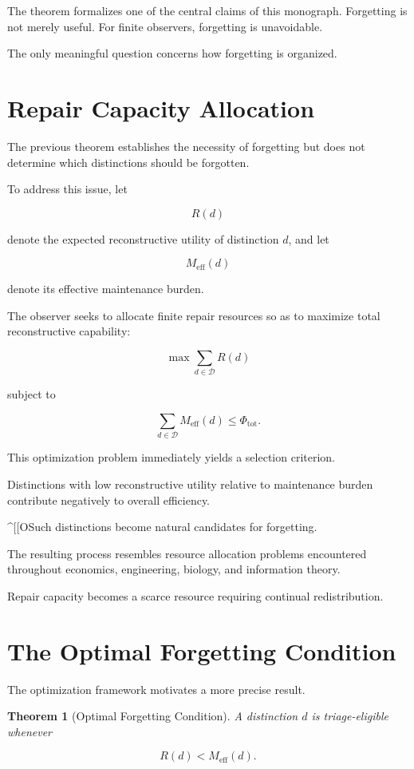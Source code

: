 \documentclass[12pt,oneside]{book}
\theoremstyle{plain} \newtheorem{theorem}{Theorem}[chapter] \newtheorem{lemma}[theorem]{Lemma} \newtheorem{proposition}[theorem]{Proposition} \newtheorem{corollary}[theorem]{Corollary}
\theoremstyle{definition} \newtheorem{definition}[theorem]{Definition} \newtheorem{axiom}[theorem]{Axiom} \newtheorem{construction}[theorem]{Construction}
\theoremstyle{remark} \newtheorem{remark}[theorem]{Remark} \newtheorem{example}[theorem]{Example}
\newcommand{\D}{\mathcal{D}} \newcommand{\R}{\mathcal{R}} \newcommand{\F}{\mathcal{F}} \newcommand{\U}{\mathcal{U}} \newcommand{\M}{\mathcal{M}} \newcommand{\G}{\Gamma}
\begin{document}
The theorem formalizes one of the central claims of this monograph. Forgetting is not merely useful. For finite observers, forgetting is unavoidable.

The only meaningful question concerns how forgetting is organized.

\section{Repair Capacity Allocation}

The previous theorem establishes the necessity of forgetting but does not determine which distinctions should be forgotten.

To address this issue, let

\[
R(d)
\]

denote the expected reconstructive utility of distinction $d$, and let

\[
M_{\mathrm{eff}}(d)
\]

denote its effective maintenance burden.

The observer seeks to allocate finite repair resources so as to maximize total reconstructive capability:

\[
\max
\sum_{d\in\D}
R(d)
\]

subject to

\[
\sum_{d\in\D}
M_{\mathrm{eff}}(d)
\leq
\Phi_{\mathrm{tot}}.
\]

This optimization problem immediately yields a selection criterion.

Distinctions with low reconstructive utility relative to maintenance burden contribute negatively to overall efficiency.

^[[OSuch distinctions become natural candidates for forgetting.

The resulting process resembles resource allocation problems encountered throughout economics, engineering, biology, and information theory.

Repair capacity becomes a scarce resource requiring continual redistribution.

\section{The Optimal Forgetting Condition}

The optimization framework motivates a more precise result.

\begin{theorem}[Optimal Forgetting Condition]

A distinction $d$ is triage-eligible whenever

\[
R(d)
<
M_{\mathrm{eff}}(d).
\]

\end{theorem}
\end{document}
